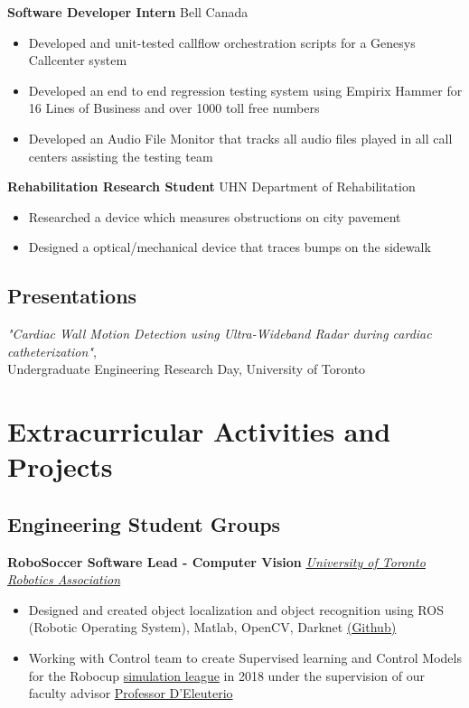 \documentclass[10pt, a4paper]{cv}
\begin{document}
	\textbf{Software Developer Intern} \hfill Bell Canada
	\begin{itemize}
		\item Developed and unit-tested callflow orchestration scripts for a Genesys Callcenter system
		\item Developed an end to end regression testing system using Empirix Hammer for 16 Lines of Business and over 1000 toll free numbers
		\item Developed an Audio File Monitor that tracks all audio files played in all call centers assisting the testing team
	\end{itemize}
	
	\textbf{Rehabilitation Research Student} \hfill UHN Department of Rehabilitation
	\begin{itemize}
		\item Researched a device which measures obstructions on city pavement
		\item Designed a optical/mechanical device that traces bumps on the sidewalk
	\end{itemize}

\subsection*{Presentations}\noindent
{}\textit{"Cardiac Wall Motion Detection using Ultra-Wideband Radar during cardiac catheterization"}, \\Undergraduate Engineering Research Day, University of Toronto

\section*{Extracurricular Activities and Projects}

\subsection*{Engineering Student Groups}\noindent

	\textbf{RoboSoccer Software Lead - Computer Vision} \hfill \emph{\href{http://www.utra.ca}{University of Toronto Robotics Association}}
	\begin{itemize}
		\item Designed and created object localization and object recognition using ROS (Robotic Operating System), Matlab, OpenCV, Darknet
	    \href{https://github.com/utra-robosoccer/soccerbot}{(Github)}
		\item Working with Control team to create Supervised learning and Control Models for the Robocup \href{http://wiki.robocup.org/Soccer_Simulation_League}{simulation league} in 2018 under the supervision of our faculty advisor \href{http://www.utias.utoronto.ca/research/space-robotics/}{Professor D’Eleuterio}
	\end{itemize}
	
\end{document}
